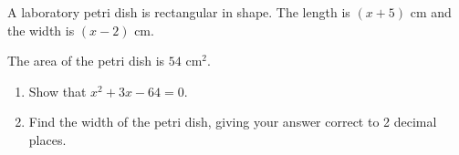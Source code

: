\begin{question}
\noindent A laboratory petri dish is rectangular in shape. The length is $(x + 5)$ cm and the width is $(x - 2)$ cm.

\begin{center}
\end{center}

\noindent The area of the petri dish is $54\text{ cm}^2$.

\begin{enumerate}
    \item[(a)] Show that $x^2 + 3x - 64 = 0$.
    \vspace{3.5cm}

    \item[(b)] Find the width of the petri dish, giving your answer correct to 2 decimal places.
    \vspace{4cm}
\end{enumerate}
\end{question}
